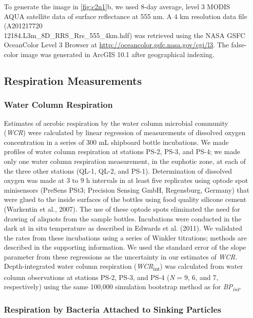 To generate the image in \autoref{fig:c2n1}b, we used 8-day average, level 3 MODIS AQUA satellite data of surface reflectance at 555 nm. A 4 km resolution data file (A201217720\\12184.L3m\_8D\_RRS\_Rrs\_555\_4km.hdf) was retrieved using the NASA GSFC\\OceanColor Level 3 Browser at \url{http://oceancolor.gsfc.nasa.gov/cgi/l3}. The false-color image was generated in ArcGIS 10.1 after geographical indexing.

\subsection{Respiration Measurements}

\subsubsection{Water Column Respiration}

Estimates of aerobic respiration by the water column microbial community (\emph{WCR}) were calculated by linear regression of measurements of dissolved oxygen concentration in a series of 300 mL shipboard bottle incubations. We made profiles of water column respiration at stations PS-2, PS-3, and PS-4; we made only one water column respiration measurement, in the euphotic zone, at each of the three other stations (QL-1, QL-2, and PS-1). Determination of dissolved oxygen was made at 3 to 9 h intervals in at least five replicates using optode spot minisensors (PreSens PSt3; Precision Sensing GmbH, Regensburg, Germany) that were glued to the inside surfaces of the bottles using food quality silicone cement (Warkentin et al., 2007). The use of these optode spots eliminated the need for drawing of aliquots from the sample bottles. Incubations were conducted in the dark at in situ temperature as described in Edwards et al. (2011). We validated the rates from these incubations using a series of Winkler titrations; methods are described in the supporting information. We used the standard error of the slope parameter from these regressions as the uncertainty in our estimates of \emph{WCR}. Depth-integrated water column respiration (\emph{WCR}\textsubscript{int}) was calculated from water column observations at stations PS-2, PS-3, and PS-4 (\emph{N} = 9, 6, and 7, respectively) using the same 100,000 simulation bootstrap method as for \emph{BP\textsubscript{int}}.

\subsubsection{Respiration by Bacteria Attached to Sinking Particles}
\label{ssec:Respiration by Bacteria Attached to Sinking Particles}

